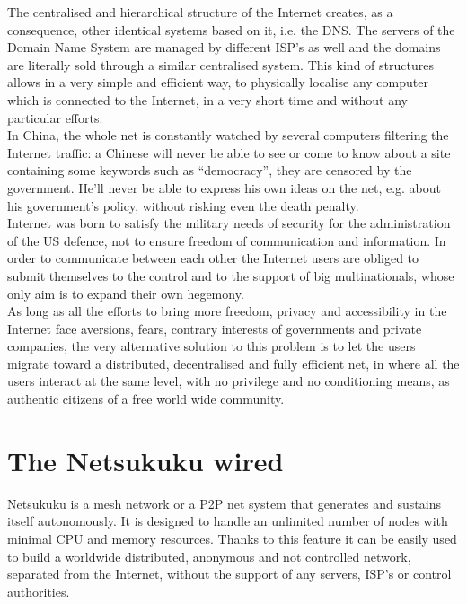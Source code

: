 \documentclass[a4paper]{article}
\begin{document}
The centralised and hierarchical structure of the Internet creates, as a
consequence, other identical systems based on it, i.e. the DNS.
The servers of the Domain Name System are managed by different ISP's as well
and the domains are literally sold through a similar centralised system.
This kind of structures allows in a very simple and efficient way, to
physically localise any computer which is connected to the Internet, in a
very short time and without any particular efforts.\\

In China, the whole net is constantly watched by several computers filtering
the Internet traffic: a Chinese will never be able to see or come to know
about a site containing some keywords such as ``democracy'', they are
censored by the government. He'll never be able to express his own ideas
on the net, e.g. about his government's policy, without risking even the
death penalty.\\

Internet was born to satisfy the military needs of security for the
administration of the US defence, not to ensure freedom of communication
and information. In order to communicate between each other the Internet
users are obliged to submit themselves to the control and to the support
of big multinationals, whose only aim is to expand their own hegemony.\\

As long as all the efforts to bring more freedom, privacy and accessibility
in the Internet face aversions, fears, contrary interests of governments and
private companies, the very alternative solution to this problem is to let
the users migrate toward a distributed, decentralised and fully efficient
net, in where all the users interact at the same level, with no privilege
and no conditioning means, as authentic citizens of a free world wide
community.

\section{The Netsukuku wired}

Netsukuku is a mesh network or a P2P net system that generates and sustains
itself autonomously. It is designed to handle an unlimited number of nodes
with minimal CPU and memory resources. Thanks to this feature it can be
easily used to build a worldwide distributed, anonymous and not controlled
network, separated from the Internet, without the support of any servers,
ISP's or control authorities.\\
\end{document}
